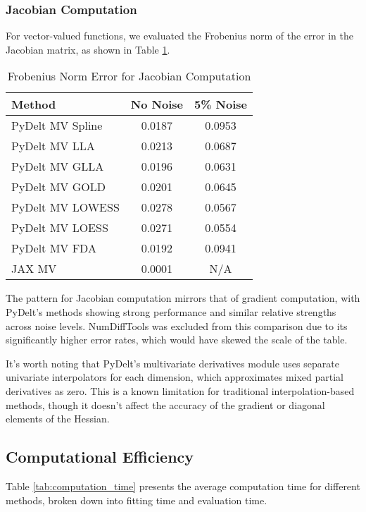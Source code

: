 \documentclass[11pt,a4paper]{article}
\begin{document}
\subsubsection{Jacobian Computation}

For vector-valued functions, we evaluated the Frobenius norm of the error in the Jacobian matrix, as shown in Table \ref{tab:jacobian}.

\begin{table}[!t]
\caption{Frobenius Norm Error for Jacobian Computation}
\label{tab:jacobian}
\centering
\begin{tabular}{lcc}
\toprule
\textbf{Method} & \textbf{No Noise} & \textbf{5\% Noise} \\
\midrule
PyDelt MV Spline & 0.0187 & 0.0953 \\
PyDelt MV LLA & 0.0213 & 0.0687 \\
PyDelt MV GLLA & 0.0196 & 0.0631 \\
PyDelt MV GOLD & 0.0201 & 0.0645 \\
PyDelt MV LOWESS & 0.0278 & 0.0567 \\
PyDelt MV LOESS & 0.0271 & 0.0554 \\
PyDelt MV FDA & 0.0192 & 0.0941 \\
JAX MV & 0.0001 & N/A \\
\bottomrule
\end{tabular}
\end{table}

The pattern for Jacobian computation mirrors that of gradient computation, with PyDelt's methods showing strong performance and similar relative strengths across noise levels. NumDiffTools was excluded from this comparison due to its significantly higher error rates, which would have skewed the scale of the table.

It's worth noting that PyDelt's multivariate derivatives module uses separate univariate interpolators for each dimension, which approximates mixed partial derivatives as zero. This is a known limitation for traditional interpolation-based methods, though it doesn't affect the accuracy of the gradient or diagonal elements of the Hessian.

\subsection{Computational Efficiency}

Table \ref{tab:computation_time} presents the average computation time for different methods, broken down into fitting time and evaluation time.
\end{document}
